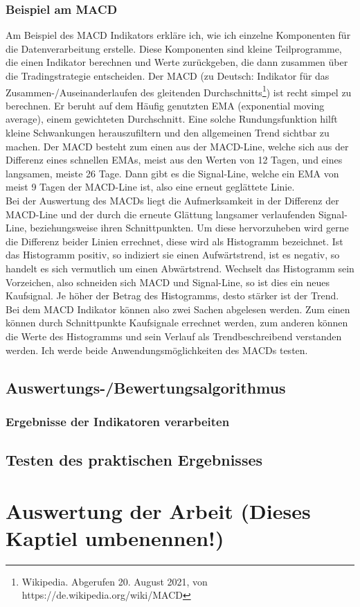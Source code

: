 \documentclass[12pt]{article}
\begin{document}
	\subsubsection{Beispiel am MACD}
		Am Beispiel des MACD Indikators erkläre ich, wie ich einzelne Komponenten für die Datenverarbeitung erstelle. Diese Komponenten sind kleine Teilprogramme, die einen Indikator berechnen und Werte zurückgeben, die dann zusammen über die Tradingstrategie entscheiden.
		Der MACD (zu Deutsch: Indikator für das Zusammen-/Auseinanderlaufen des gleitenden Durchschnitts\footnote{Wikipedia. Abgerufen 20. August 2021, von https://de.wikipedia.org/wiki/MACD}) ist recht simpel zu berechnen. Er beruht auf dem Häufig genutzten EMA (exponential moving average), einem gewichteten Durchschnitt. Eine solche Rundungsfunktion hilft kleine Schwankungen herauszufiltern und den allgemeinen Trend sichtbar zu machen. Der MACD besteht zum einen aus der MACD-Line, welche sich aus der Differenz eines schnellen EMAs, meist aus den Werten von 12 Tagen, und eines langsamen, meiste 26 Tage. Dann gibt es die Signal-Line, welche ein EMA von meist 9 Tagen der MACD-Line ist, also eine erneut geglättete Linie.\\
		Bei der Auswertung des MACDs liegt die Aufmerksamkeit in der Differenz der MACD-Line und der durch die erneute Glättung langsamer verlaufenden Signal-Line, beziehungsweise ihren Schnittpunkten. Um diese hervorzuheben wird gerne die Differenz beider Linien errechnet, diese wird als Histogramm bezeichnet. Ist das Histogramm positiv, so indiziert sie einen Aufwärtstrend, ist es negativ, so handelt es sich vermutlich um einen Abwärtstrend. Wechselt das Histogramm sein Vorzeichen, also schneiden sich MACD und Signal-Line, so ist dies ein neues Kaufsignal. Je höher der Betrag des Histogramms, desto stärker ist der Trend.\\
		Bei dem MACD Indikator können also zwei Sachen abgelesen werden. Zum einen können durch Schnittpunkte Kaufsignale errechnet werden, zum anderen können die Werte des Histogramms und sein Verlauf als Trendbeschreibend verstanden werden. Ich werde beide Anwendungsmöglichkeiten des MACDs testen.
\subsection{Auswertungs-/Bewertungsalgorithmus}
	\subsubsection{Ergebnisse der Indikatoren verarbeiten}
\subsection{Testen des praktischen Ergebnisses}
\section{Auswertung der Arbeit (Dieses Kaptiel umbenennen!)}
\end{document}

